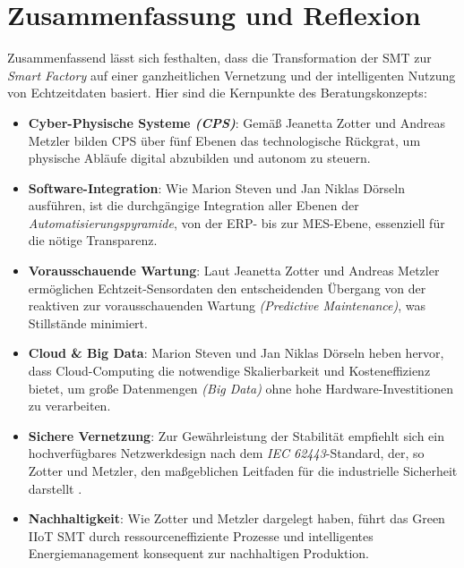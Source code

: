 
\chapter{Zusammenfassung und Reflexion}
\label{chap:zusammenfassung}
\thispagestyle{fancy}

Zusammenfassend lässt sich festhalten, dass die Transformation der \acs{SMT} zur \textit{Smart Factory} auf einer ganzheitlichen Vernetzung und der intelligenten Nutzung von Echtzeitdaten basiert. Hier sind die Kernpunkte des Beratungskonzepts:

\begin{itemize}[leftmargin=*]
    \item \textbf{Cyber-Physische Systeme \textit{(\acs{CPS})}}: Gemäß Jeanetta Zotter und Andreas Metzler \cite[4-5]{2} bilden \acs{CPS} über fünf Ebenen das technologische Rückgrat, um physische Abläufe digital abzubilden und autonom zu steuern.
    
    \item \textbf{Software-Integration}: Wie Marion Steven und Jan Niklas Dörseln \cite[11]{1} ausführen, ist die durchgängige Integration aller Ebenen der \textit{Automatisierungspyramide}, von der \acs{ERP}- bis zur \acs{MES}-Ebene, essenziell für die nötige Transparenz.
    
    \item \textbf{Vorausschauende Wartung}: Laut Jeanetta Zotter und Andreas Metzler \cite[39]{2} ermöglichen Echtzeit-Sensordaten den entscheidenden Übergang von der reaktiven zur vorausschauenden Wartung \textit{(Predictive Maintenance)}, was Stillstände minimiert.
    
    \item \textbf{Cloud \& Big Data}: Marion Steven und Jan Niklas Dörseln \cite[75-76]{1} heben hervor, dass Cloud-Computing die notwendige Skalierbarkeit und Kosteneffizienz bietet, um große Datenmengen \textit{(Big Data)} ohne hohe Hardware-Investitionen zu verarbeiten.
    
    \item \textbf{Sichere Vernetzung}: Zur Gewährleistung der Stabilität empfiehlt sich ein hochverfügbares Netzwerkdesign nach dem \textit{\acs{IEC} 62443}-Standard, der, so Zotter und Metzler, den maßgeblichen Leitfaden für die industrielle Sicherheit darstellt \cite[73]{2}.
    
    \item \textbf{Nachhaltigkeit}: Wie Zotter und Metzler \cite[79]{2} dargelegt haben, führt das \glqq Green \acs{IIoT}\grqq{} \acs{SMT} durch ressourceneffiziente Prozesse und intelligentes Energiemanagement konsequent zur nachhaltigen Produktion.
\end{itemize}

